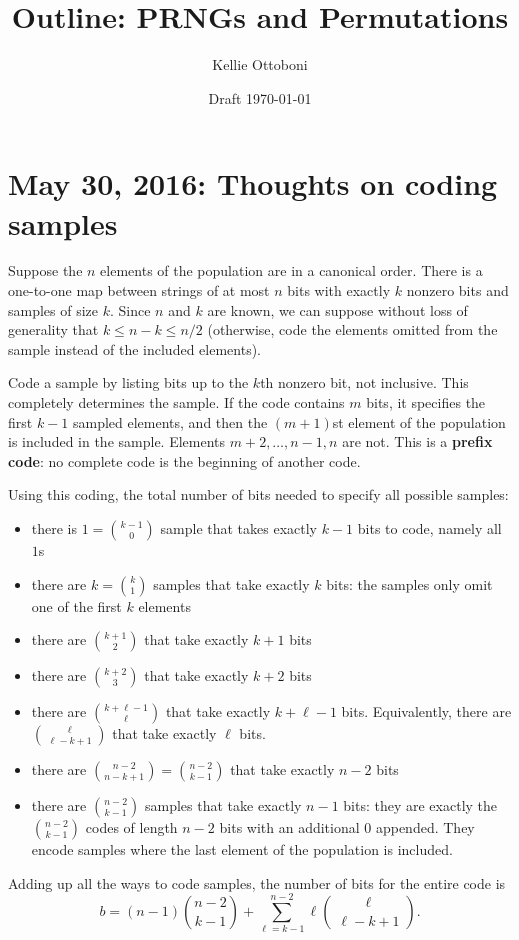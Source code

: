 \documentclass[12pt]{article}
\title{Outline: PRNGs and Permutations}
\author{Kellie Ottoboni}
\date{Draft \today}
\begin{document}
\maketitle






\section{May 30, 2016: Thoughts on coding samples}

Suppose the $n$ elements of the population are in a canonical order.
There is a one-to-one map between strings of at most $n$ bits with exactly $k$ nonzero bits
and samples of size $k$. 
Since $n$ and $k$ are known, we can suppose without loss of generality that $k \le n-k \le n/2$
(otherwise, code the elements omitted from the sample instead of the included elements).

Code a sample by listing bits up to the $k$th nonzero bit, not inclusive.
This completely determines the sample.
If the code contains $m$ bits, it specifies the first $k-1$ sampled elements, and then the $(m+1)$st element of the population is included in the sample.
Elements $m+2, \dots, n-1, n$ are not.
This is a \textbf{prefix code}: no complete code is the beginning of another code.

Using this coding, the total number of bits needed to specify all possible samples:
\begin{itemize}
\item there is  $1 = {{k-1} \choose {0}}$ sample that takes exactly $k-1$ bits to code, namely all $1$s
\item there are $k = {{k} \choose {1}}$ samples that take exactly $k$ bits: the samples only omit one of the first $k$ elements
\item there are ${{k+1} \choose 2} $ that take exactly $k+1$ bits
\item there are $ {{k+2} \choose 3} $ that take exactly $k+2$ bits
\item there are $ {{k+\ell-1} \choose {\ell}} $ that take exactly $k+\ell-1$ bits. Equivalently, there are ${{\ell} \choose {\ell - k + 1}}$ that take exactly $\ell$ bits.
\item there are $ {{n-2} \choose {n - k+1}} = {{n-2} \choose {k-1}} $ that take exactly $n-2$ bits
\item there are $ {{n-2} \choose {k-1}} $ samples that take exactly $n-1$ bits: they are exactly the $ {{n-2} \choose {k-1}} $ codes of length $n-2$ bits with an additional $0$ appended. They encode samples where the last element of the population is included.
\end{itemize}
Adding up all the ways to code samples, the number of bits for the entire code is
$$ b = (n-1)  {{n-2} \choose {k-1}} + \sum_{\ell=k-1}^{n-2} \ell {{\ell} \choose {\ell-k+1}}.$$
\end{document}
